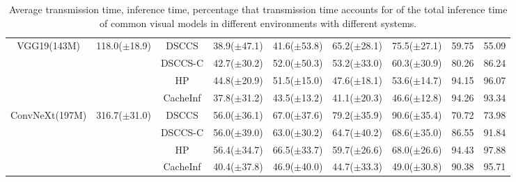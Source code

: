 \begin{table}[htb]
\begin{tabular}{ccc|c|c|c|c|c|c}
\multirow[c]{4}{*}{VGG19(143M)} & \multirow[c]{4}{*}{118.0($\pm$18.9)} & DSCCS & 38.9($\pm$47.1) & 41.6($\pm$53.8) & 65.2($\pm$28.1) & 75.5($\pm$27.1) & 59.75 & 55.09 \\
 &  & DSCCS-C & 42.7($\pm$30.2) & 52.0($\pm$50.3) & 53.2($\pm$33.0) & 60.3($\pm$30.9) & 80.26 & 86.24 \\
 &  & HP & 44.8($\pm$20.9) & 51.5($\pm$15.0) & 47.6($\pm$18.1) & 53.6($\pm$14.7) & 94.15 & 96.07 \\
 &  & CacheInf & 37.8($\pm$31.2) & 43.5($\pm$13.2) & 41.1($\pm$20.3) & 46.6($\pm$12.8) & 94.26 & 93.34 \\
\cline{1-9} \cline{2-9}
\multirow[c]{4}{*}{ConvNeXt(197M)} & \multirow[c]{4}{*}{316.7($\pm$31.0)} & DSCCS & 56.0($\pm$36.1) & 67.0($\pm$37.6) & 79.2($\pm$35.9) & 90.6($\pm$35.4) & 70.72 & 73.98 \\
 &  & DSCCS-C & 56.0($\pm$39.0) & 63.0($\pm$30.2) & 64.7($\pm$40.2) & 68.6($\pm$35.0) & 86.55 & 91.84 \\
 &  & HP & 56.4($\pm$34.7) & 66.5($\pm$33.7) & 59.7($\pm$26.6) & 68.0($\pm$26.6) & 94.43 & 97.88 \\
 &  & CacheInf & 40.4($\pm$37.8) & 46.9($\pm$40.0) & 44.7($\pm$33.3) & 49.0($\pm$30.8) & 90.38 & 95.71 \\
\cline{1-9} \cline{2-9}
\bottomrule
\end{tabular}
    \caption{Average transmission time, inference time, percentage that transmission time accounts for of the total inference time of common visual models in different environments with different systems. }
    \label{tab:torchvision_time}
    \vspace{-0.3cm}
\end{table}

